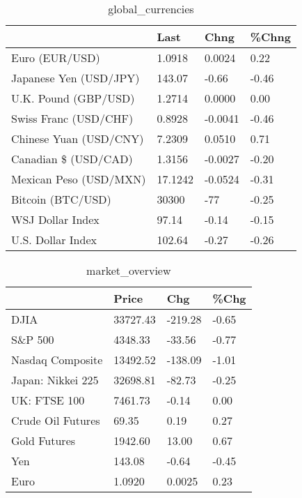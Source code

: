 \documentclass{article}%
\begin{document}
%


\begin{table}[htbp]%
\caption{global\_currencies}%
\centering%
\begin{adjustbox}{width=1\textwidth}%
\begin{tabular}{llll}
\toprule
                       &    Last &    Chng & \%Chng \\
\midrule
        Euro (EUR/USD) &  1.0918 &  0.0024 &  0.22 \\
Japanese Yen (USD/JPY) &  143.07 &   -0.66 & -0.46 \\
  U.K. Pound (GBP/USD) &  1.2714 &  0.0000 &  0.00 \\
 Swiss Franc (USD/CHF) &  0.8928 & -0.0041 & -0.46 \\
Chinese Yuan (USD/CNY) &  7.2309 &  0.0510 &  0.71 \\
  Canadian \$ (USD/CAD) &  1.3156 & -0.0027 & -0.20 \\
Mexican Peso (USD/MXN) & 17.1242 & -0.0524 & -0.31 \\
     Bitcoin (BTC/USD) &   30300 &     -77 & -0.25 \\
      WSJ Dollar Index &   97.14 &   -0.14 & -0.15 \\
     U.S. Dollar Index &  102.64 &   -0.27 & -0.26 \\
\bottomrule
\end{tabular}
%
\end{adjustbox}%
\end{table}

%


\begin{table}[htbp]%
\caption{market\_overview}%
\centering%
\begin{adjustbox}{width=1\textwidth}%
\begin{tabular}{llll}
\toprule
                  &    Price &     Chg &  \%Chg \\
\midrule
             DJIA & 33727.43 & -219.28 & -0.65 \\
          S\&P 500 &  4348.33 &  -33.56 & -0.77 \\
 Nasdaq Composite & 13492.52 & -138.09 & -1.01 \\
Japan: Nikkei 225 & 32698.81 &  -82.73 & -0.25 \\
     UK: FTSE 100 &  7461.73 &   -0.14 &  0.00 \\
Crude Oil Futures &    69.35 &    0.19 &  0.27 \\
     Gold Futures &  1942.60 &   13.00 &  0.67 \\
              Yen &   143.08 &   -0.64 & -0.45 \\
             Euro &   1.0920 &  0.0025 &  0.23 \\
\bottomrule
\end{tabular}
%
\end{adjustbox}%
\end{table}

%
\end{document}
